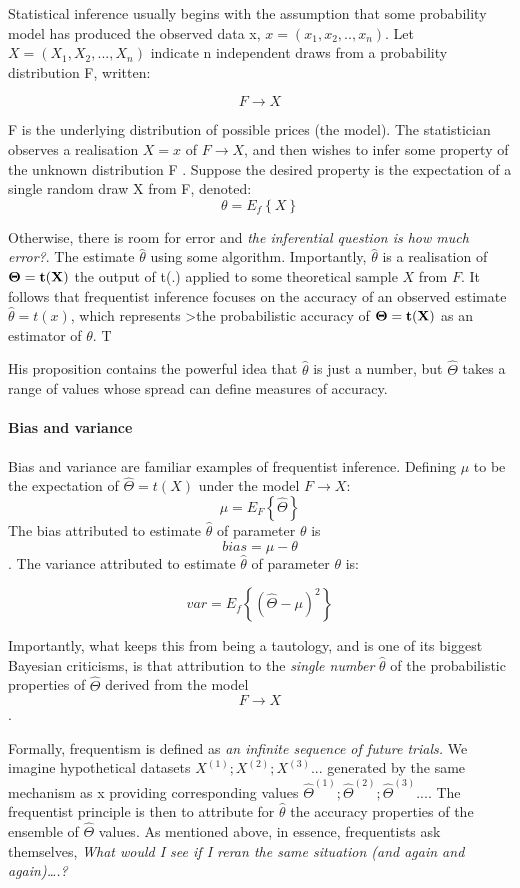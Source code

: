 \documentclass{article}
\begin{document}
Statistical inference usually begins with the assumption that some
probability model has produced the observed data x,
\(x=(x_1,x_2,..,x_n)\). Let \(X=(X_1,X_2,...,X_n)\) indicate n
independent draws from a probability distribution F, written:

\[F \to X\]

F is the underlying distribution of possible prices (the model). The
statistician observes a realisation \(X= x\) of \(F \to X\), and then
wishes to infer some property of the unknown distribution F . Suppose
the desired property is the expectation of a single random draw X from
F, denoted: \[\theta=E_f\left\{ X \right\}\]

Otherwise, there is room for error and \emph{the inferential question is
how much error?}. The estimate \(\hat{\theta}\) using some algorithm.
Importantly, \(\hat{\theta}\) is a realisation of \(\bf{\Theta}=t(X)\)
the output of t(.) applied to some theoretical sample \(X\) from \(F\).
It follows that frequentist inference focuses on the accuracy of an
observed estimate \(\hat{\theta}=t(x)\), which represents
\textgreater the probabilistic accuracy of \(\bf{\Theta}=t(X)\) as an
estimator of \(\theta\). T

His proposition contains the powerful idea that \(\hat{\theta}\) is just
a number, but \(\hat{\Theta}\) takes a range of values whose spread can
define measures of accuracy.

\hypertarget{bias-and-variance}{%
\paragraph{Bias and variance}\label{bias-and-variance}}

Bias and variance are familiar examples of frequentist inference.
Defining \(\mu\) to be the expectation of \(\hat{\Theta}=t(X)\) under
the model \(F \to X\): \[\mu=E_F\left\{\hat{\Theta}\right\}\] The bias
attributed to estimate \(\hat{\theta}\) of parameter \(\theta\) is
\[bias=\mu - \theta\]. The variance attributed to estimate
\(\hat{\theta}\) of parameter \(\theta\) is:

\[var=E_f\left\{(\hat{\Theta}-\mu)^2\right\}\]

Importantly, what keeps this from being a tautology, and is one of its
biggest Bayesian criticisms, is that attribution to the \emph{single
number} \(\hat{\theta}\) of the probabilistic properties of
\(\hat{\Theta}\) derived from the model \[F \to X\].

Formally, frequentism is defined as \emph{an infinite sequence of future
trials.} We imagine hypothetical datasets \(X^{(1)};X^{(2)};X^{(3)}...\)
generated by the same mechanism as x providing corresponding values
\(\hat{\Theta}^{(1)};\hat{\Theta}^{(2)};\hat{\Theta}^{(3)}...\). The
frequentist principle is then to attribute for \(\hat{\theta}\) the
accuracy properties of the ensemble of \(\hat{\Theta}\) values. As
mentioned above, in essence, frequentists ask themselves, \emph{What
would I see if I reran the same situation (and again and again)\ldots.?}
\end{document}
